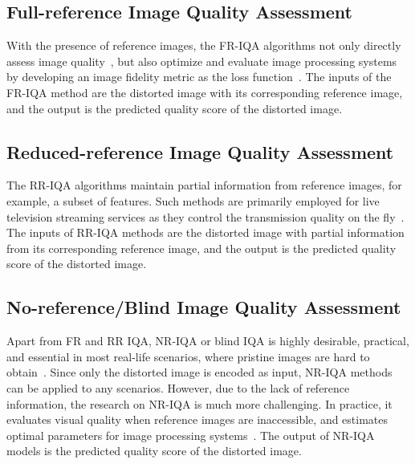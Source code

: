 	\subsection{Full-reference Image Quality Assessment}
	With the presence of reference images, the FR-IQA algorithms not only directly assess image quality~\citep{bosse2017deep}, but also optimize and evaluate image processing systems by developing an image fidelity metric as the loss function~\citep{ding2021comparison}. The inputs of the FR-IQA method are the distorted image with its corresponding reference image, and the output is the predicted quality score of the distorted image.
	
	\subsection{Reduced-reference Image Quality Assessment}
	The RR-IQA algorithms maintain partial information from reference images, for example, a subset of features. Such methods are primarily employed for live television streaming services as they control the transmission quality on the fly~\citep{wang2011reduced}. The inputs of RR-IQA methods are the distorted image with partial information from its corresponding reference image, and the output is the predicted quality score of the distorted image.
	
	\subsection{No-reference/Blind Image Quality Assessment}
	Apart from FR and RR IQA, NR-IQA or blind IQA is highly desirable, practical, and essential in most real-life scenarios, where pristine images are hard to obtain~\citep{mittal2012no}. Since only the distorted image is encoded as input, NR-IQA methods can be applied to any scenarios. However, due to the lack of reference information, the research on NR-IQA is much more challenging. In practice, it evaluates visual quality when reference images are inaccessible, and estimates optimal parameters for image processing systems~\citep{mittal2012no, zhu2010automatic}. The output of NR-IQA models is the predicted quality score of the distorted image.

